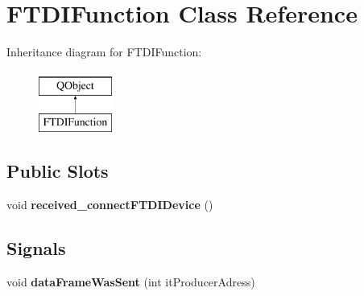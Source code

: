 \hypertarget{class_f_t_d_i_function}{}\section{F\+T\+D\+I\+Function Class Reference}
\label{class_f_t_d_i_function}
Inheritance diagram for F\+T\+D\+I\+Function\+:\begin{figure}[H]
\begin{center}
\leavevmode
\includegraphics[height=2.000000cm]{class_f_t_d_i_function}
\end{center}
\end{figure}
\subsection*{Public Slots}
\begin{DoxyCompactItemize}
\item 
\mbox{\label{class_f_t_d_i_function_a3ac9e01bf46dd75313071203c520cc48}} 
void {\bfseries received\+\_\+connect\+F\+T\+D\+I\+Device} ()
\end{DoxyCompactItemize}
\subsection*{Signals}
\begin{DoxyCompactItemize}
\item 
\mbox{\label{class_f_t_d_i_function_a951912c84e613a0e36de3b4b815dc50d}} 
void {\bfseries data\+Frame\+Was\+Sent} (int it\+Producer\+Adress)
\end{DoxyCompactItemize}
